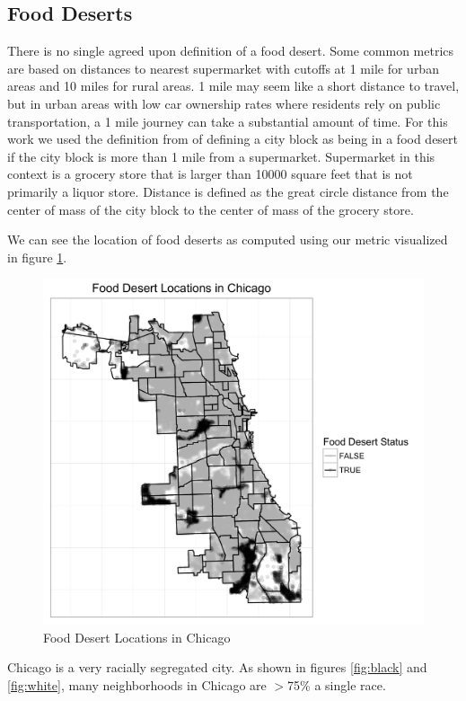 \documentclass{report}
\begin{document}
\subsection*{Food Deserts}
There is no single agreed upon definition of a food desert. Some common metrics are based on distances to nearest supermarket with cutoffs at 1 mile for urban areas and 10 miles for rural areas. 1 mile may seem like a short distance to travel, but in urban areas with low car ownership rates where residents rely on public transportation, a 1 mile journey can take a substantial amount of time. 
For this work we used the definition from %
of defining a city block as being in a food desert if the city block is more than 1 mile from a supermarket. Supermarket in this context is a grocery store that is larger than 10000 square feet %
that is not primarily a liquor store. Distance is defined as the great circle distance from the center of mass of the city block to the center of mass of the grocery store.

We can see the location of food deserts as computed using our metric visualized in figure \ref{fig:desert}. 
\begin{figure}[h!]
  \includegraphics[scale=.2]{deserts_plot}
  \caption{Food Desert Locations in Chicago}
  \label{fig:desert}
\end{figure}

Chicago is a very racially segregated city. As shown in figures \ref{fig:black} and \ref{fig:white}, many neighborhoods in Chicago are $>$75\% a single race.
\end{document}
